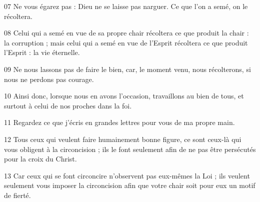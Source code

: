 07 Ne vous égarez pas : Dieu ne se laisse pas narguer. Ce que l’on a semé, on le récoltera.

08 Celui qui a semé en vue de sa propre chair récoltera ce que produit la chair : la corruption ; mais celui qui a semé en vue de l’Esprit récoltera ce que produit l’Esprit : la vie éternelle.

09 Ne nous lassons pas de faire le bien, car, le moment venu, nous récolterons, si nous ne perdons pas courage.

10 Ainsi donc, lorsque nous en avons l’occasion, travaillons au bien de tous, et surtout à celui de nos proches dans la foi.

11 Regardez ce que j’écris en grandes lettres pour vous de ma propre main.

12 Tous ceux qui veulent faire humainement bonne figure, ce sont ceux-là qui vous obligent à la circoncision ; ils le font seulement afin de ne pas être persécutés pour la croix du Christ.

13 Car ceux qui se font circoncire n’observent pas eux-mêmes la Loi ; ils veulent seulement vous imposer la circoncision afin que votre chair soit pour eux un motif de fierté.
